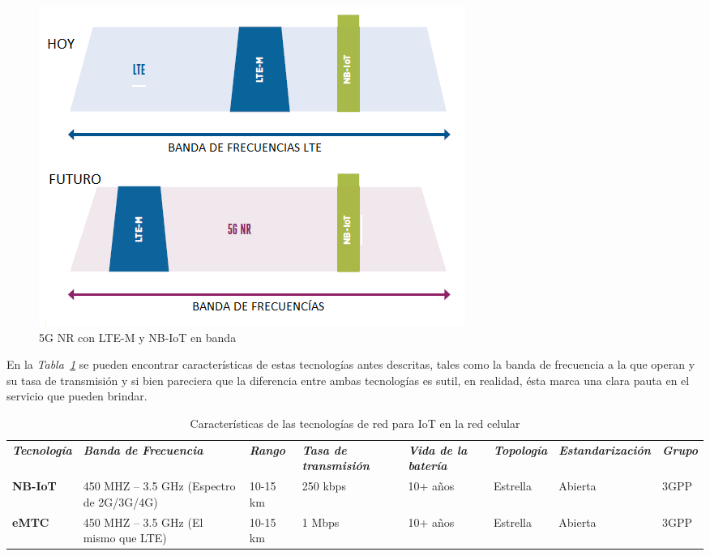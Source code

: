\begin{figure}[th]
\centering
\includegraphics[scale=1]{Figures/5G NR con LTE-M y NB-IoT en banda}
\decoRule
\caption[5G NR con LTE-M y NB-IoT en banda]{5G NR con LTE-M y NB-IoT en banda}
\label{fig:5gnr}
\end{figure}

En la \textit{Tabla~\ref{tab:tecIoT}} se pueden encontrar características de estas tecnologías antes descritas, tales como la banda de frecuencia a la que operan y su tasa de transmisión y si bien pareciera que la diferencia entre ambas tecnologías es sutil, en realidad, ésta marca una clara pauta en el servicio que pueden brindar. \newline

\begin{table}
\caption{Características de las tecnologías de red para IoT en la red celular}
\label{tab:tecIoT}
\centering
\begin{tabular}{|p{0.9in}|p{0.6in}|p{0.4in}|p{0.6in}|p{0.4in}|p{0.8in}|p{1.3in}|p{0.4in}|} \\ 
\textbf{\textit{Tecnología}} & \textbf{\textit{Banda de Frecuencia}} & \textbf{\textit{Rango}} & \textbf{\textit{Tasa de transmisión}} & \textbf{\textit{Vida de la batería}} & \textbf{\textit{Topología}} & \textbf{\textit{Estandarización}} & \textbf{\textit{Grupo}} \\ 
\textbf{NB-IoT}  & \footnotesize{ 450 MHZ -- 3.5 GHz (Espectro de 2G/3G/4G) } & \footnotesize{ 10-15 km } & \footnotesize{ 250 kbps } & \footnotesize{ 10+ años } & \footnotesize{ Estrella } & \footnotesize{ Abierta } & \footnotesize{ 3GPP } \\ \hline
\textbf{eMTC}  & \footnotesize{ 450 MHZ -- 3.5 GHz (El mismo que LTE) } & \footnotesize{ 10-15 km } & \footnotesize{ 1 Mbps } & \footnotesize{ 10+ años } & \footnotesize{ Estrella } & \footnotesize{ Abierta } & \footnotesize{ 3GPP } \\
\end{tabular}

\end{table}


